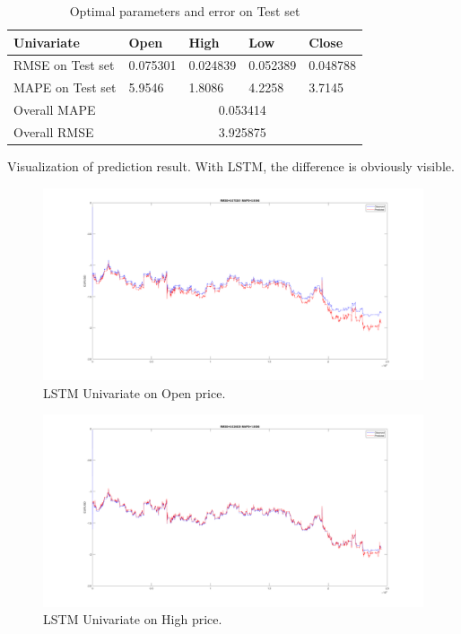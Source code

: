 \documentclass[11pt]{article}
\begin{document}
\begin{table}[H]
  \centering
\begin{tabular}{|l|l|l|l|l|}
  \hline
  Univariate       & Open        & High       & Low        & Close      \\ \hline
  RMSE on Test set & 0.075301    & 0.024839   & 0.052389   & 0.048788   \\ \hline
  MAPE on Test set & 5.9546      & 1.8086     & 4.2258     & 3.7145     \\ \hline
  Overall MAPE     & \multicolumn{4}{c|}{0.053414}                      \\ \hline
  Overall RMSE     & \multicolumn{4}{c|}{3.925875}                      \\ \hline
\end{tabular}
\caption{Optimal parameters and error on Test set}
\end{table}

Visualization of prediction result. With LSTM, the difference is obviously visible.

\begin{figure}[H]
  \centering
  \includegraphics[width=\textwidth,keepaspectratio]{figs/lstm_uni_open.png}
  \caption{LSTM Univariate on Open price.}
\end{figure}

\begin{figure}[H]
  \centering
  \includegraphics[width=\linewidth,keepaspectratio]{figs/lstm_uni_high.png}
  \caption{LSTM Univariate on High price.}
\end{figure}
\end{document}

